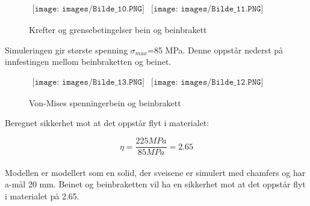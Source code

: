 \begin{figure}[H]
\begin{center}$
\begin{array}{ccc}
\texttt{[image: images/Bilde\_10.PNG]} &
\texttt{[image: images/Bilde\_11.PNG]} &  
\end{array}$
\end{center}
\caption{Krefter og grensebetingelser bein og beinbrakett}
\end{figure}

Simuleringen gir største spenning $\sigma_{max}$=85 MPa. Denne oppstår nederst på innfestingen mellom beinbraketten og beinet.

\begin{figure}[H]
\begin{center}$
\begin{array}{ccc}
\texttt{[image: images/Bilde\_13.PNG]} &
\texttt{[image: images/Bilde\_12.PNG]} &  
\end{array}$
\end{center}
\caption{Von-Mises spenningerbein og beinbrakett}
\end{figure}

Beregnet sikkerhet mot at det oppstår flyt i materialet:

\begin{equation}
\eta=\frac{225 MPa}{85 MPa}=2.65
\end{equation}\\

Modellen er modellert som en solid, der sveisene er simulert med chamfers og har a-mål 20 mm.\newline
Beinet og beinbraketten vil ha en sikkerhet mot at det oppstår flyt i materialet på 2.65.
